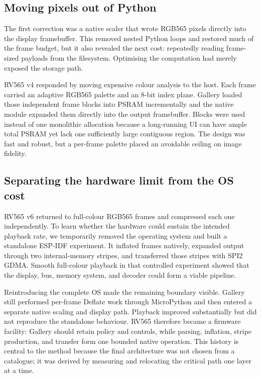 \documentclass[11pt,twocolumn]{article}
\begin{document}
\subsection{Moving pixels out of Python}

The first correction was a native scaler that wrote RGB565 pixels directly
into the display framebuffer.  This removed nested Python loops and restored
much of the frame budget, but it also revealed the next cost: repeatedly
reading frame-sized payloads from the filesystem.  Optimising the computation
had merely exposed the storage path.

RV565 v4 responded by moving expensive colour analysis to the host.  Each
frame carried an adaptive RGB565 palette and an 8-bit index plane.  Gallery
loaded those independent frame blocks into PSRAM incrementally and the native
module expanded them directly into the output framebuffer.  Blocks were used
instead of one monolithic allocation because a long-running UI can have ample
total PSRAM yet lack one sufficiently large contiguous region.  The design was
fast and robust, but a per-frame palette placed an avoidable ceiling on image
fidelity.

\subsection{Separating the hardware limit from the OS cost}

RV565 v6 returned to full-colour RGB565 frames and compressed each one
independently.  To learn whether the hardware could sustain the intended
playback rate, we temporarily removed the operating system and built a
standalone ESP-IDF experiment.  It inflated frames natively, expanded output
through two internal-memory stripes, and transferred those stripes with SPI2
GDMA.  Smooth full-colour playback in that controlled experiment showed that
the display, bus, memory system, and decoder could form a viable pipeline.

Reintroducing the complete OS made the remaining boundary visible.  Gallery
still performed per-frame Deflate work through MicroPython and then entered a
separate native scaling and display path.  Playback improved substantially but
did not reproduce the standalone behaviour.  RV565 therefore became a
firmware facility: Gallery should retain policy and controls, while parsing,
inflation, stripe production, and transfer form one bounded native operation.
This history is central to the method because the final architecture was not
chosen from a catalogue; it was derived by measuring and relocating the
critical path one layer at a time.
\end{document}
